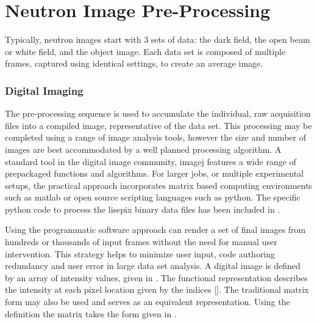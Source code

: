 \documentclass[../../main.tex]{subfiles}
\begin{document}
%
    \section{Neutron Image Pre-Processing}%
    \label{app:image-processing:preprocessing}%
    Typically, neutron images start with 3 sets of data: the dark field, the open beam or white field, and the object image.
    Each data set is composed of multiple frames, captured using identical settings, to create an average image.
    \subsubsection{Digital Imaging}%
    The pre-processing sequence is used to accumulate the individual, raw acquisition files into a compiled image, representative of the data set.
    This processing may be completed using a range of image analysis tools, however the size and number of images are best accommodated by a well planned processing algorithm.
    A standard tool in the digital image community, \gls{imagej} features a wide range of prepackaged functions and algorithms.
    For larger jobs, or multiple experimental setups, the practical approach incorporates matrix based computing environments such as \gls{matlab} or open source scripting languages such as \gls{python}.
    The specific \gls{python} code to process the \gls{lisepix} binary data files has been included in .
    \par%
    Using the programmatic software approach can render a set of final images from hundreds or thousands of input frames without the need for manual user intervention.
    This strategy helps to minimize user input, code authoring redundancy and user error in large data set analysis.
    A digital image is defined by an  array of intensity values, given in  \cite{book:Gonzalez_2007}.
    The functional representation  describes the intensity at each pixel location given by the indices [].
    The traditional matrix form may also be used and serves as an equivalent representation.
    Using the definition  the matrix takes the form given in  \cite{book:Gonzalez_2007}.
\end{document}
